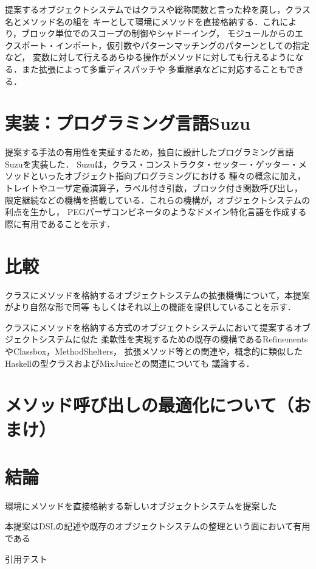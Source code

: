 \documentclass{ipsjprosym}
\begin{document}
提案するオブジェクトシステムではクラスや総称関数と言った枠を廃し，クラス名とメソッド名の組を
キーとして環境にメソッドを直接格納する．これにより，ブロック単位でのスコープの制御やシャドーイング，
モジュールからのエクスポート・インポート，仮引数やパターンマッチングのパターンとしての指定など，
変数に対して行えるあらゆる操作がメソッドに対しても行えるようになる．また拡張によって多重ディスパッチや
多重継承などに対応することもできる．

\section{実装：プログラミング言語Suzu}

提案する手法の有用性を実証するため，独自に設計したプログラミング言語Suzuを実装した．
Suzuは，クラス・コンストラクタ・セッター・ゲッター・メソッドといったオブジェクト指向プログラミングにおける
種々の概念に加え，トレイトやユーザ定義演算子，ラベル付き引数，ブロック付き関数呼び出し，
限定継続などの機構を搭載している．これらの機構が，オブジェクトシステムの利点を生かし，
PEGパーザコンビネータのようなドメイン特化言語を作成する際に有用であることを示す．

\section{比較}

クラスにメソッドを格納するオブジェクトシステムの拡張機構について，本提案がより自然な形で同等
もしくはそれ以上の機能を提供していることを示す．

クラスにメソッドを格納する方式のオブジェクトシステムにおいて提案するオブジェクトシステムに似た
柔軟性を実現するための既存の機構であるRefinementsやClassbox，MethodShelters，
拡張メソッド等との関連や，概念的に類似したHaskellの型クラスおよびMixJuiceとの関連についても
議論する．

\section{メソッド呼び出しの最適化について（おまけ）}



\section{結論}

環境にメソッドを直接格納する新しいオブジェクトシステムを提案した

本提案はDSLの記述や既存のオブジェクトシステムの整理という面において有用である

引用テスト\cite{latex}





\end{document}
